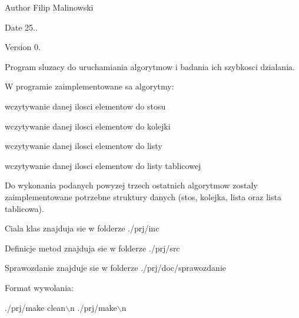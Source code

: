 \begin{DoxyAuthor}{Author}
Filip Malinowski 
\end{DoxyAuthor}
\begin{DoxyDate}{Date}
25.. 
\end{DoxyDate}
\begin{DoxyVersion}{Version}
0.
\end{DoxyVersion}
Program sluzacy do uruchamiania algorytmow i badania ich szybkosci dzialania.\par
W programie zaimplementowane sa algorytmy\-:\par

\begin{DoxyItemize}
\item wczytywanie danej ilosci elementow do stosu\par

\item wczytywanie danej ilosci elementow do kolejki\par

\item wczytywanie danej ilosci elementow do listy\par

\item wczytywanie danej ilosci elementow do listy tablicowej
\end{DoxyItemize}

Do wykonania podanych powyzej trzech ostatnich algorytmow zostaly zaimplementowane potrzebne struktury danych (stos, kolejka, lista oraz lista tablicowa).\par
\par
Ciala klas znajduja sie w folderze ./prj/inc\par
Definicje metod znajduja sie w folderze ./prj/src\par
Sprawozdanie znajduje sie w folderze ./prj/doc/sprawozdanie\par
\par
Format wywolania\-:\par

\begin{DoxyCode}
./prj/make clean\(\backslash\)n
./prj/make\(\backslash\)n
\end{DoxyCode}
 